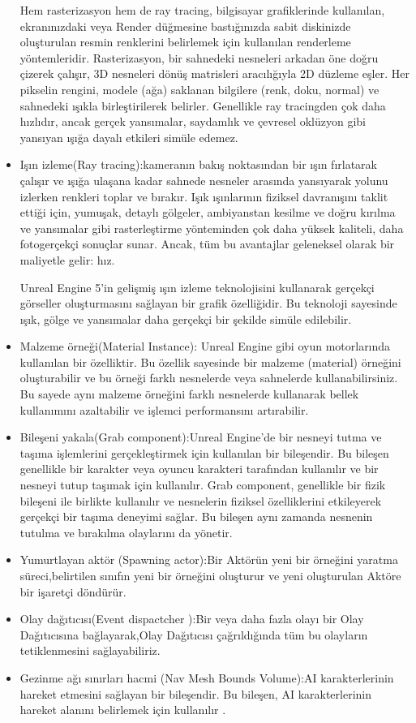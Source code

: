 \documentclass[12pt,a4paper]{article}
\begin{document}
\begin{itemize}
		 	   Hem rasterizasyon hem de ray tracing, bilgisayar grafiklerinde kullanılan, ekranınızdaki veya Render düğmesine bastığınızda sabit diskinizde oluşturulan resmin renklerini belirlemek için kullanılan renderleme yöntemleridir. Rasterizasyon, bir sahnedeki nesneleri arkadan öne doğru çizerek çalışır, 3D nesneleri dönüş matrisleri aracılığıyla 2D düzleme eşler. Her pikselin rengini, modele (ağa) saklanan bilgilere (renk, doku, normal) ve sahnedeki ışıkla birleştirilerek belirler. Genellikle ray tracingden çok daha hızlıdır, ancak gerçek yansımalar, saydamlık ve çevresel oklüzyon gibi yansıyan ışığa dayalı etkileri simüle edemez.
		 	 \item Işın izleme(Ray tracing):kameranın bakış noktasından bir ışın fırlatarak çalışır ve ışığa ulaşana kadar sahnede nesneler arasında yansıyarak yolunu izlerken renkleri toplar ve bırakır. Işık ışınlarının fiziksel davranışını taklit ettiği için, yumuşak, detaylı gölgeler, ambiyanstan kesilme ve doğru kırılma ve yansımalar gibi rasterleştirme yönteminden çok daha yüksek kaliteli, daha fotogerçekçi sonuçlar sunar. Ancak, tüm bu avantajlar geleneksel olarak bir maliyetle gelir: hız.
		 	 
		 	 Unreal Engine 5'in gelişmiş ışın izleme teknolojisini kullanarak gerçekçi görseller oluşturmasını sağlayan bir grafik özelliğidir. Bu teknoloji sayesinde ışık, gölge ve yansımalar daha gerçekçi bir şekilde simüle edilebilir.
		 		 
		 	
		 	 
		 	 	\item Malzeme örneği(Material Instance): Unreal Engine gibi oyun motorlarında kullanılan bir özelliktir. Bu özellik sayesinde bir malzeme (material) örneğini oluşturabilir ve bu örneği farklı nesnelerde veya sahnelerde kullanabilirsiniz. Bu sayede aynı malzeme örneğini farklı nesnelerde kullanarak bellek kullanımını azaltabilir ve işlemci performansını artırabilir.
		 	\item Bileşeni yakala(Grab component):Unreal Engine'de bir nesneyi tutma ve taşıma işlemlerini gerçekleştirmek için kullanılan bir bileşendir. Bu bileşen genellikle bir karakter veya oyuncu karakteri tarafından kullanılır ve bir nesneyi tutup taşımak için kullanılır.
		 	Grab component, genellikle bir fizik bileşeni ile birlikte kullanılır ve nesnelerin fiziksel özelliklerini etkileyerek gerçekçi bir taşıma deneyimi sağlar. Bu bileşen aynı zamanda nesnenin tutulma ve bırakılma olaylarını da yönetir.
		 	\item Yumurtlayan aktör (Spawning actor):Bir Aktörün yeni bir örneğini yaratma süreci,belirtilen sınıfın yeni bir örneğini oluşturur ve yeni oluşturulan Aktöre bir işaretçi döndürür\cite{spawn}.
		 	\item Olay dağıtıcısı(Event dispactcher ):Bir veya daha fazla olayı bir Olay Dağıtıcısına bağlayarak,Olay Dağıtıcısı çağrıldığında tüm bu olayların tetiklenmesini sağlayabiliriz\cite{eventdis}.
	    \item Gezinme ağı sınırları hacmi (Nav Mesh Bounds Volume):AI karakterlerinin hareket etmesini sağlayan bir bileşendir. Bu bileşen, AI karakterlerinin hareket alanını belirlemek için kullanılır \cite{aıalan}.
	     \end{itemize}
	     
\end{document}
